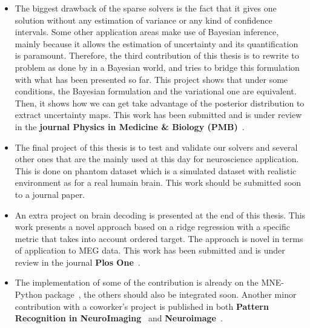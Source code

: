\begin{itemize}
\item The biggest drawback of the sparse solvers is the fact that it gives one solution without any estimation of variance or any kind of confidence intervals. Some other application areas make use of Bayesian inference, mainly because it allows the estimation of uncertainty and its quantification is paramount. Therefore, the third contribution of this thesis is to rewrite to problem as done by in a Bayesian world, and tries to bridge this formulation with what has been presented so far. This project shows that under some conditions, the Bayesian formulation and the variational one are equivalent. Then, it shows how we can get take advantage of the posterior distribution to extract uncertainty maps. This work has been submitted and is under review in the \textbf{journal Physics in Medicine \& Biology (PMB)}~\cite{bekhti_arxiv_pmb}.

\item The final project of this thesis is to test and validate our solvers and several other ones that are the mainly used at this day for neuroscience application. This is done on phantom dataset which is a simulated dataset with realistic environment as for a real humain brain. This work should be submitted soon to a journal paper.

\item An extra project on brain decoding is presented at the end of this thesis. This work presents a novel approach based on a ridge regression with a specific metric that takes into account ordered target. The approach is novel in terms of application to MEG data. This work has been submitted and is under review in the journal \textbf{Plos One}~\cite{Bekhti_bioarxiv}.

\item The implementation of some of the contribution is already on the MNE-Python package~\cite{MNE}, the others should also be integrated soon. Another minor contribution with a coworker's project is published in both \textbf{Pattern Recognition in NeuroImaging}~\cite{jas_autoreject_prni} and \textbf{Neuroimage}~\cite{jas_neuroimage}.
\end{itemize}

